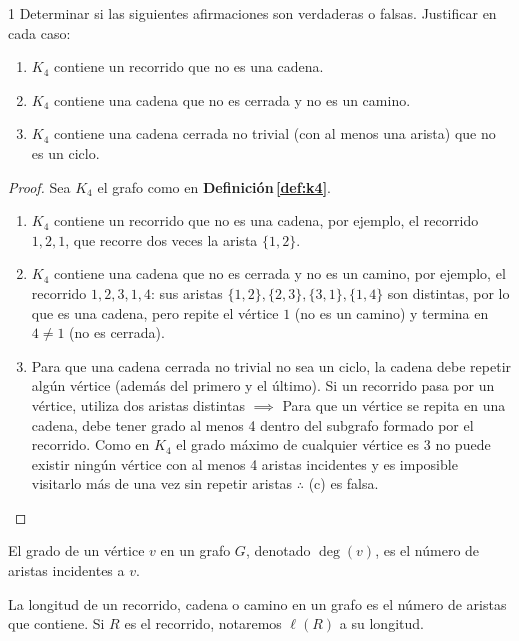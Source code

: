 \begin{ejercicio}{1}
    Determinar si las siguientes afirmaciones son verdaderas o falsas. Justificar en cada caso:
    \begin{enumerate}
        \item \( K_4 \) contiene un recorrido que no es una cadena.
        \item \( K_4 \) contiene una cadena que no es cerrada y no es un camino.
        \item \( K_4 \) contiene una cadena cerrada no trivial (con al menos una arista) que no es un ciclo.
    \end{enumerate}
\end{ejercicio}
\begin{proof}
    Sea \( K_4 \) el grafo como en \textbf{Definición\,\ref{def:k4}}.\begin{enumerate}
        \item \( K_4 \) contiene un recorrido que no es una cadena, por ejemplo, el recorrido \( 1, 2, 1 \), que recorre dos veces la arista \( \{1,2\} \).
        \item \( K_4 \) contiene una cadena que no es cerrada y no es un camino, por ejemplo, el recorrido \( 1, 2, 3, 1, 4 \): sus aristas \( \{1,2\}, \{2,3\}, \{3,1\}, \{1,4\} \) son distintas, por lo que es una cadena, pero repite el vértice \( 1 \) (no es un camino) y termina en \( 4 \neq 1 \) (no es cerrada).
        \item Para que una cadena cerrada no trivial no sea un ciclo, la cadena debe repetir algún vértice (además del primero y el último). Si un recorrido pasa por un vértice, utiliza dos aristas distintas \( \implies \) Para que un vértice se repita en una cadena, debe tener grado al menos 4 dentro del subgrafo formado por el recorrido. Como en \( K_4 \) el grado máximo de cualquier vértice es 3 no puede existir ningún vértice con al menos 4 aristas incidentes y es imposible visitarlo más de una vez sin repetir aristas \( \therefore \) (c) es falsa.
    \end{enumerate}
\end{proof}

\clearpage

\begin{definition}
    El grado de un vértice \( v \) en un grafo \( G \), denotado \( \deg(v) \), es el número de aristas incidentes a \( v \).
\end{definition}

\begin{definition}
    La longitud de un recorrido, cadena o camino en un grafo es el número de aristas que contiene. Si \( R \) es el recorrido, notaremos \( \ell(R) \) a su longitud.
\end{definition}

